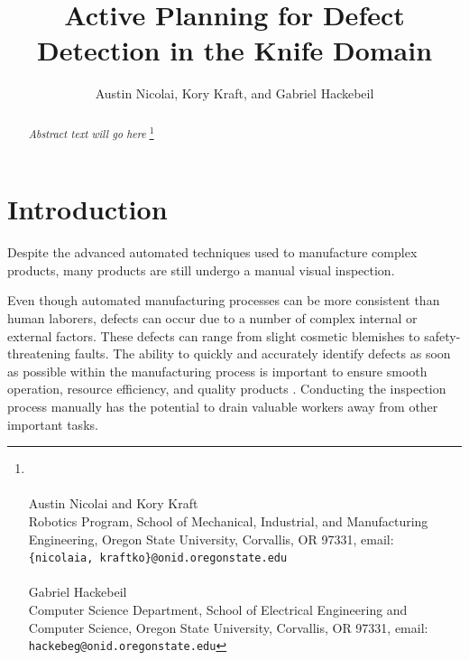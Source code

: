 \documentclass[letterpaper, 10 pt, conference]{ieeeconf}  %
\title{\LARGE \bf 
Active Planning for Defect Detection in the Knife Domain
}
\author{Austin Nicolai, Kory Kraft, and Gabriel Hackebeil}
\begin{document}
\maketitle
\thispagestyle{empty}
\pagestyle{empty}

\begin{abstract}
\textit{Abstract text will go here}
\let\thefootnote\relax\footnote{\hrulefill
\\\hspace*{1em} \hfill
\\\hspace*{1em} Austin Nicolai and Kory Kraft
\\\hspace*{1em} Robotics Program, School of Mechanical, Industrial, and Manufacturing
\\\hspace*{1em} Engineering, Oregon State University, Corvallis, OR 97331, email: 
\\\hspace*{1em} {\tt\small \{nicolaia, kraftko\}@onid.oregonstate.edu}
\\\hspace*{1em} \hfill
\\\hspace*{1em} Gabriel Hackebeil
\\\hspace*{1em} Computer Science Department, School of Electrical Engineering and
\\\hspace*{1em} Computer Science, Oregon State University, Corvallis, OR 97331, email: 
\\\hspace*{1em} {\tt\small hackebeg@onid.oregonstate.edu}
}
\end{abstract}


\section{Introduction}


Despite the advanced automated techniques used to manufacture complex products, many products are still undergo a manual visual inspection. 

Even though automated manufacturing processes can be more consistent than human laborers, defects can occur due to a number of complex internal or external factors. These defects can range from slight cosmetic blemishes to safety-threatening faults. The ability to quickly and accurately identify defects as soon as possible within the manufacturing process is important to ensure smooth operation, resource efficiency, and quality products \cite{matScience}. Conducting the inspection process manually has the potential to drain valuable workers away from other important tasks.
\end{document}
